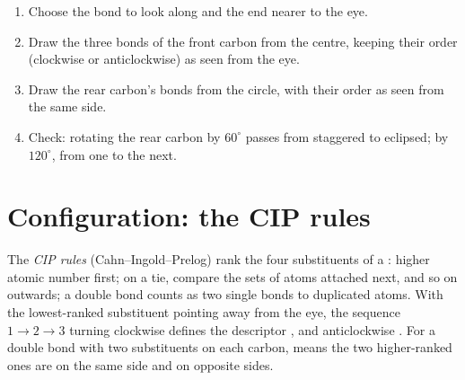 \begin{method}\label{met:b1:stereochemistry-in-depth:newman-from-cram}
\begin{enumerate}
  \item Choose the bond to look along and the end nearer to the eye.
  \item Draw the three bonds of the front carbon from the centre,
        keeping their order (clockwise or anticlockwise) as seen from the
        eye.
  \item Draw the rear carbon's bonds from the circle, with their order as
        seen from the same side.
  \item Check: rotating the rear carbon by $60^\circ$ passes from
        staggered to eclipsed; by $120^\circ$, from one  to the next.
\end{enumerate}
\end{method}

\section{Configuration: the CIP rules}

\begin{definition}\label{def:b1:stereochemistry-in-depth:cip}
The \emph{CIP rules} (Cahn--Ingold--Prelog) rank the four
substituents of a : higher atomic number first; on a
tie, compare the sets of atoms attached next, and so on outwards; a
double bond counts as two single bonds to duplicated atoms. With the
lowest-ranked substituent pointing away from the eye, the sequence
$1 \to 2 \to 3$ turning clockwise defines the descriptor , and
anticlockwise . For a double bond with two substituents on each
carbon,  means the two higher-ranked ones are on the same side and
 on opposite sides.
\end{definition}

